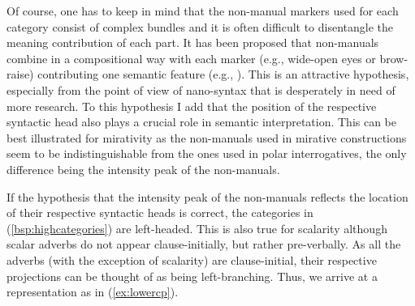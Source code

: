 \noindent Of course, one has to keep in mind that the non-manual markers used for each category consist of complex bundles and it is often difficult to disentangle the meaning contribution of each part. It has been proposed that non-manuals combine in a compositional way with each marker (e.g., wide-open eyes or brow-raise) contributing one semantic feature (e.g., \citealt{herrmann2013modal}). This is an attractive hypothesis, especially from the point of view of nano-syntax that is desperately in need of more research. To this hypothesis I add that the position of the respective syntactic head also plays a crucial role in semantic interpretation. This can be best illustrated for mirativity as the non-manuals used in mirative constructions seem to be indistinguishable from the ones used in polar interrogatives, the only difference being the intensity peak of the non-manuals. 

If the hypothesis that the intensity peak of the non-manuals reflects the location of their respective syntactic heads is correct, the categories in (\ref{bsp:highcategories}) are left-headed. This is also true for scalarity although scalar adverbs do not appear clause-initially, but rather pre-verbally. As all the adverbs (with the exception of scalarity) are clause-initial, their respective projections can be thought of as being left-branching. Thus, we arrive at a representation as in (\ref{ex:lowercp}). 




\begin{exe}
\ex \label{ex:lowercp}
\end{exe}



